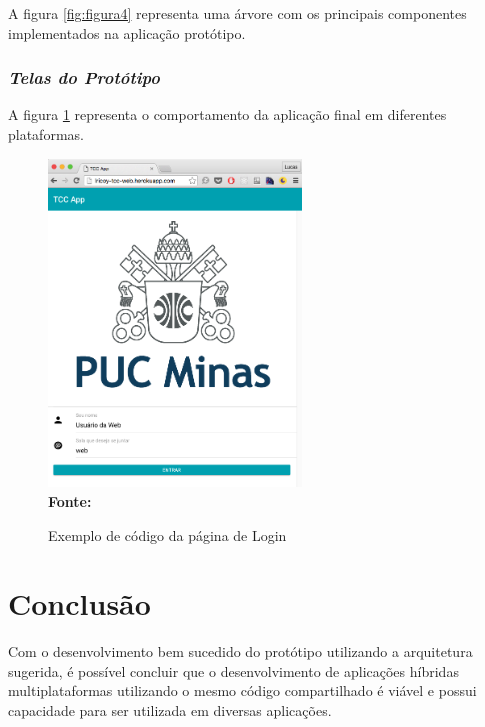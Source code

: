 A figura \ref{fig:figura4} representa uma árvore com os principais componentes implementados na aplicação protótipo.

\subsubsection{{\it Telas do Protótipo}}
A figura \ref{fig:figura5} representa o comportamento da aplicação final em diferentes plataformas.

\begin{figure}[ht]
	\centering	
	\caption[\hspace{0.1cm}Exemplo de código da página de Login.]{Exemplo de código da página de Login}
	\vspace{-0.4cm}
	\includegraphics[width=0.6\textwidth]{figuras/ExemploTela.png}
	\vspace{-0.2cm}
	\\\textbf{\footnotesize Fonte: \cite{pressman2011} }
	\label{fig:figura5}
\end{figure}
\vspace{-0.5cm}



\section{\esp Conclusão}

Com o desenvolvimento bem sucedido do protótipo utilizando a arquitetura sugerida, é possível concluir que o desenvolvimento de aplicações híbridas multiplataformas utilizando o mesmo código compartilhado é viável e possui capacidade para ser utilizada em diversas aplicações.

